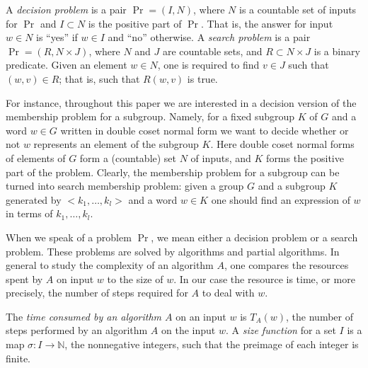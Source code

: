 \documentclass[a4paper,12pt]{article}
\newtheorem{definition}[theorem]{Definition}
\numberwithin{equation}{section}
\numberwithin{figure}{section}
\begin{document}
A \emph{decision problem} is a pair $\Pr = (I,N)$, where $N$ is a countable
set of inputs for $\Pr$ and $I\subset N$ is the positive part of
$\Pr$. That is, the answer for input $w\in N$ is ``yes'' if $w\in I$
and ``no'' otherwise. A \emph{search problem} is a pair $\Pr = (R,N\times J)$, where $N$ and $J$
are countable sets, and $R\subset N\times J$ is a binary predicate.
Given an element $w\in N$, one is required to find $v\in J$ such
that $(w,v)\in R$; that is, such that $R(w,v)$ is true.


For instance, throughout this paper we are interested in a decision version of the membership problem for a subgroup. Namely,
for a fixed subgroup $K$ of $G$ and a word $w \in G$ written in double coset normal form we want to decide
whether or not $w$ represents an element of  the subgroup $K$. Here double coset normal forms of elements of $G$ form a (countable) set $N$ of inputs, and $K$ forms the positive part of the problem. Clearly, the membership problem for a subgroup can be turned into search membership problem: given a group $G$ and a subgroup $K$  generated by $<k_1, \ldots, k_l>$ and a word $w \in K$ one should find an expression of $w$ in terms of $k_1, \ldots, k_l$.

When we speak of a problem $\Pr$, we mean either a decision problem
or a search problem. These problems are solved by algorithms and partial
algorithms. In general to study the complexity of an algorithm $A$,
one compares the resources spent by $A$ on input $w$ to the size of
$w$. In our case the resource is time, or more precisely, the number
of steps required for $A$ to deal with $w$.

The \emph{time consumed by an algorithm $A$} on an input $w$ is
$T_{A}(w)$, the number of steps performed by an algorithm $A$ on
the input $w$.
A \emph{size function} for a set $I$ is a map $\sigma:I\to \mathbb N$, the
nonnegative integers, such that the preimage of each integer is
finite.

%

\end{document}

